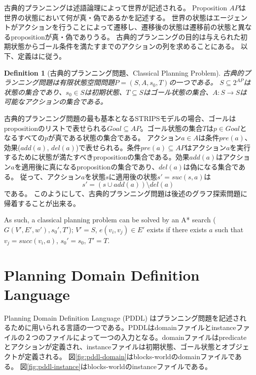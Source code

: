 \documentclass{report}
\newtheorem{definition}{Definition}
\begin{document}
古典的プランニングは述語論理によって世界が記述される\cite{fikes:71}。
Proposition $AP$は世界の状態において何が真・偽であるかを記述する。
世界の状態はエージェントがアクションを行うことによって遷移し、遷移後の状態は遷移前の状態と異なるpropositionが真・偽でありうる。
古典的プランニングの目的は与えられた初期状態からゴール条件を満たすまでのアクションの列を求めることにある。
以下、定義は\cite{edelkamp:2010:hst:1875144}に従う。

\begin{definition}[古典的プランニング問題、Classical Planning Problem]
古典的プランニング問題は有限状態空間問題$P = (S,A,s_0,T)$の一つである。
$S \subseteq 2^{AP}$は状態の集合であり、$s_0 \in S$は初期状態、$T \subseteq S$はゴール状態の集合、$A: S \rightarrow S$は可能なアクションの集合である。
\end{definition}

古典的プランニング問題の最も基本となるSTRIPSモデル\cite{fikes:71}の場合、ゴールはpropositionのリストで表せられる$Goal \subseteq AP$。ゴール状態の集合$T$は$p \in Goal$となるすべての$p$が真である状態の集合である。
アクション$a \in A$は条件$pre(a)$、効果($add(a)$, $del(a)$)で表せられる。条件$pre(a) \subseteq AP$はアクション$a$を実行するために状態が満たすべきpropositionの集合である。効果$add(a)$はアクション$a$を適用後に真になるpropositionの集合であり、$del(a)$は偽になる集合である。
従って、アクション$a$を状態$s$に適用後の状態$s' = suc(s,a)$は
\begin{equation}
	s' = (s \cup add(a)) \setminus del(a)
\end{equation}
である。
このようにして、古典的プランニング問題は後述のグラフ探索問題に帰着することが出来る。

As such, a classical planning problem can be solved by an A* search ($G(V', E', w'), s_0', T'$); $V' = S$, $e(v_i, v_j) \in E'$ exists if there exists $a$ such that $v_j = succ(v_i, a)$, $s_0' = s_0$, $T' = T$.

\section{Planning Domain Definition Language}
Planning Domain Definition Language (PDDL) \cite{aeronautiques1998pddl}はプランニング問題を記述されるために用いられる言語の一つである。PDDLはdomainファイルとinstanceファイルの２つのファイルによって一つの入力となる。domainファイルはpredicateとアクションが定義され、instanceファイルは初期状態、ゴール状態とオブジェクトが定義される。
図\ref{fig:pddl-domain}はblocks-worldのdomainファイルである。
図\ref{fig:pddl-instance}はblocks-worldのinstanceファイルである。
\end{document}
